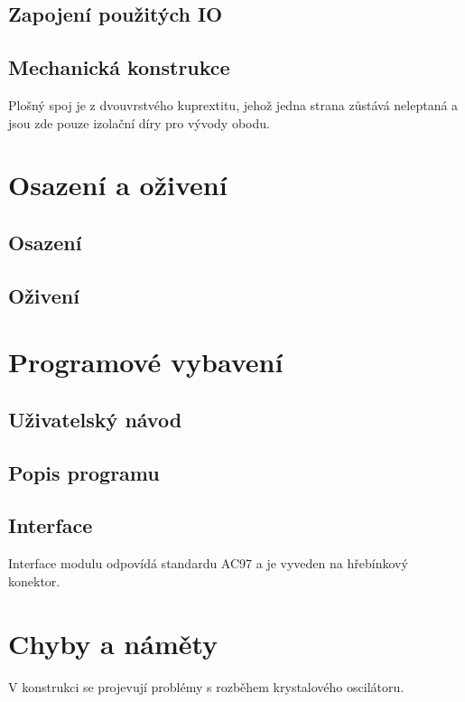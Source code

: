\documentclass[a4paper]{article}
\begin{document}
\subsection{Zapojen\'i pou\v{z}it\'ych IO}
\subsection{Mechanick\'a konstrukce}
{
Plo\v{s}n\'y spoj je z dvouvrstv\'eho kuprextitu, jeho\v{z} jedna strana
z\r{u}st\'av\'a neleptan\'a a jsou zde pouze izola\v{c}n\'i d\'iry pro
v\'yvody obodu.}

\section{Osazen\'i a o\v{z}iven\'i }
\subsection{Osazen\'i}
\subsection{O\v{z}iven\'i}
\section{Programov\'e vybaven\'i}
\subsection{U\v{z}ivatelsk\'y n\'avod}
\subsection{Popis programu}
\subsection{Interface}
{
Interface modulu odpov\'id\'a standardu AC97 a je vyveden na
h\v{r}eb\'inkov\'y konektor.}

\section{Chyby a n\'am\v{e}ty}
{
V konstrukci se projevuj\'i probl\'emy s rozb\v{e}hem krystalov\'eho
oscil\'atoru.}
\end{document}
